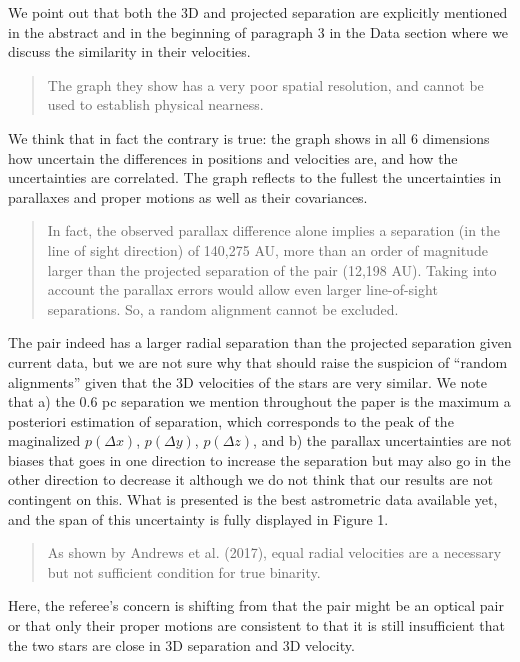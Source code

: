 \documentclass[12pt]{article}
\begin{document}
We point out that both the 3D and projected separation are explicitly
mentioned in the abstract and in the beginning of paragraph 3 in the
Data section where we discuss the similarity in their velocities.

\begin{quote}
The graph they show has a very poor spatial resolution, and cannot be
used to establish physical nearness.
\end{quote}

We think that in fact the contrary is true: the graph shows in all 6
dimensions how uncertain the differences in positions and velocities
are, and how the uncertainties are correlated. The graph reflects to the
fullest the uncertainties in parallaxes and proper motions as well as
their covariances.

\begin{quote}
In fact, the observed parallax difference alone implies a separation (in
the line of sight direction) of 140,275 AU, more than an order of
magnitude larger than the projected separation of the pair (12,198 AU).
Taking into account the parallax errors would allow even larger
line-of-sight separations. So, a random alignment cannot be excluded.
\end{quote}

The pair indeed has a larger radial separation than the projected
separation given current data, but we are not sure why that should
raise the suspicion of ``random alignments'' given that the 3D
velocities of the stars are very similar. We note that a) the 0.6 pc
separation we mention throughout the paper is the maximum a posteriori
estimation of separation, which corresponds to the peak of the
maginalized $p(\Delta x)$, $p(\Delta y)$, $p(\Delta z)$, and b) the
parallax uncertainties are not biases that goes in one direction to
increase the separation but may also go in the other direction to
decrease it although we do not think that our results are not contingent
on this.
What is presented is the best astrometric data available yet, and the span of
this uncertainty is fully displayed in Figure 1.

\begin{quote}
As shown by Andrews et al. (2017), equal radial velocities are a
necessary but not sufficient condition for true binarity.
\end{quote}

Here, the referee's concern is shifting from that the pair might be an
optical pair or that only their proper motions are consistent to that it
is still insufficient that the two stars are close in 3D separation and
3D velocity.
\end{document}
